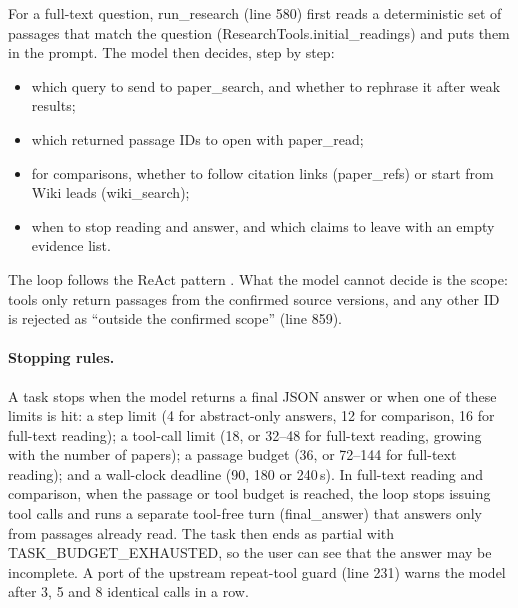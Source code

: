 \documentclass{article}
\newcommand{\code}[1]{{\ttfamily\small\hyphenchar\font=-1\relax #1}}
\begin{document}
\begin{samepage}
For a full-text question, \code{run\_research} (line 580) first reads a deterministic set of passages
that match the question (\code{ResearchTools.initial\_readings}) and puts them in the prompt. The model
then decides, step by step:
\begin{itemize}
  \item which query to send to \code{paper\_search}, and whether to rephrase it after weak results;
  \item which returned passage IDs to open with \code{paper\_read};
  \item for comparisons, whether to follow citation links (\code{paper\_refs}) or start from Wiki leads
  (\code{wiki\_search});
  \item when to stop reading and answer, and which claims to leave with an empty evidence list.
\end{itemize}
\end{samepage}
The loop follows the ReAct pattern \citep{react}. What the model cannot decide is the scope: tools only
return passages from the confirmed source versions, and any other ID is rejected as ``outside the
confirmed scope'' (line 859).

\paragraph{Stopping rules.}
A task stops when the model returns a final JSON answer or when one of these limits is hit:
a step limit (4 for abstract-only answers, 12 for comparison, 16 for full-text reading);
a tool-call limit (18, or 32--48 for full-text reading, growing with the number of papers);
a passage budget (36, or 72--144 for full-text reading); and a wall-clock deadline (90, 180 or
240\,s). In full-text reading and comparison, when the passage or tool budget is reached, the loop
stops issuing tool calls and runs a separate tool-free turn (\code{final\_answer}) that answers only
from passages already read. The task then ends as \code{partial} with \code{TASK\_BUDGET\_EXHAUSTED},
so the user can see that the answer may be incomplete. A port of the upstream repeat-tool guard (line 231) warns the model after
3, 5 and 8 identical calls in a row.
\end{document}
